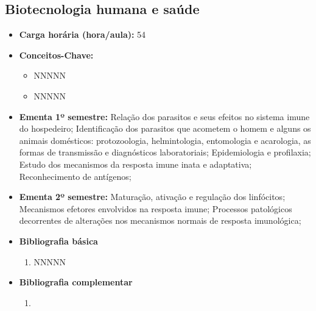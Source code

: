 \documentclass[11pt,fleqn]{book} %
\begin{document}
\subsection{Biotecnologia humana e saúde}\label{disc:biotecSaude}
\begin{itemize}
	\item \textbf{Carga horária (hora/aula):} 54
	\item \textbf{Conceitos-Chave:}
	\begin{itemize}
		\item NNNNN
		\item NNNNN
	\end{itemize}
	\item \textbf{Ementa 1º semestre:}	
	Relação dos parasitos e seus efeitos no sistema imune do hospedeiro; 
	Identificação dos parasitos que acometem o homem e alguns os animais domésticos: protozoologia, helmintologia, entomologia e acarologia, as formas de transmissão e diagnósticos laboratoriais; 
	Epidemiologia e profilaxia; 
	Estudo dos mecanismos da resposta imune inata e adaptativa; 
	Reconhecimento de antígenos; 
	\item \textbf{Ementa 2º semestre:}		
	Maturação, ativação e regulação dos linfócitos;
	Mecanismos efetores envolvidos na resposta imune;
	Processos patológicos decorrentes de alterações nos mecanismos normais de resposta imunológica;
	\item \textbf{Bibliografia básica}
	\begin{enumerate}
		\item NNNNN
	\end{enumerate}
	\item \textbf{Bibliografia complementar}
	\begin{enumerate}
		\item 
	\end{enumerate}	
\end{itemize}


\newpage
\end{document}
